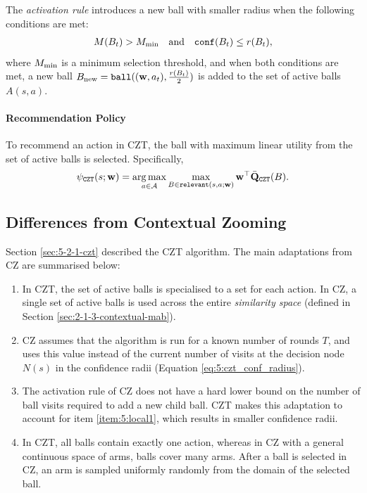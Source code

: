     The \textit{activation rule} introduces a new ball with smaller radius when the following conditions are met:
    \begin{align}
        M(B_t) > M_{\textnormal{min}} \quad \text{and} \quad {\textnormal{\texttt{conf}}}(B_t) \leq r(B_t),
    \end{align}
    where $M_{\textnormal{min}}$ is a minimum selection threshold, and when both conditions are met, a new ball $B_{\textnormal{new}} = \textnormal{\texttt{ball}}((\mathbf{w},a_t),\frac{r(B_t)}{2})$ is added to the set of active balls $A(s,a)$.

\paragraph{Recommendation Policy}

    To recommend an action in CZT, the ball with maximum linear utility from the set of active balls is selected. Specifically,
    \begin{align}
        \psi_{\textnormal{\texttt{CZT}}}(s;\mathbf{w}) = \operatorname*{arg\,max}_{a\in\mathcal{A}} \max_{B\in {\textnormal{\texttt{relevant}}}(s,a;\mathbf{w})} \mathbf{w}^\top \bar{\mathbf{Q}}_{\textnormal{\texttt{CZT}}}(B).
    \end{align}


\subsection{Differences from Contextual Zooming}
\label{sec:5-2-2-cz-diffs}

    Section \ref{sec:5-2-1-czt} described the CZT algorithm. The main adaptations from CZ are summarised below:
    \begin{enumerate}
        \item 
            In CZT, the set of active balls is specialised to a set for each action. In CZ, a single set of active balls is used across the entire \textit{similarity space} (defined in Section \ref{sec:2-1-3-contextual-mab}).
        \item \label{item:5:local1}
            CZ assumes that the algorithm is run for a known number of rounds $T$, and uses this value instead of the current number of visits at the decision node $N(s)$ in the confidence radii (Equation \ref{eq:5:czt_conf_radius}).
        \item 
            The activation rule of CZ does not have a hard lower bound on the number of ball visits required to add a new child ball. CZT makes this adaptation to account for item \ref{item:5:local1}, which results in smaller confidence radii.
        \item 
            In CZT, all balls contain exactly one action, whereas in CZ with a general continuous space of arms, balls cover many arms. After a ball is selected in CZ, an arm is sampled uniformly randomly from the domain of the selected ball. 
    \end{enumerate}

